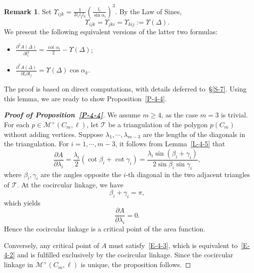 \documentclass[11pt,letterpaper]{amsart}
\theoremstyle{plain}
\theoremstyle{definition}
\newtheorem{remark}[theorem]{Remark}
\theoremstyle{remark}
\numberwithin{equation}{section}
\begin{document}
\begin{remark}\label{R-4-6}
Set $\displaystyle{\Upsilon_{ijk}=\frac{1}{2l_il_jl_k}
\left(\frac{l_i}{\sin\alpha_i}\right)^3}$.
By the Law of Sines,
\[
\Upsilon_{ijk}=\Upsilon_{jki}=\Upsilon_{kij}:=\Upsilon(\Delta).
\]
We present the following equivalent versions of the latter two formulas:
\begin{itemize}
\item[$(ii')$] $\displaystyle{\frac{\partial^2 A(\Delta)}{\partial l_i^2}=\frac{\cot\alpha_i}{2}-\Upsilon(\Delta)}$;
\item[$(iii')$] $\displaystyle{\frac{\partial^2 A(\Delta)}{\partial l_i \partial l_j}=\Upsilon(\Delta)\cos\alpha_k}$.
\end{itemize}
\end{remark}


The proof is based on direct computations, with details deferred to~\S\ref{S-7}. Using this lemma, we are ready to show Proposition~\ref{P-4-4}.


\begin{proof}[\textbf{Proof of Proposition~\ref{P-4-4}}]
We assume $m\geq 4$, as the case $m=3$ is trivial. For each $p\in \mathcal M^{+}(C_m,\ell)$, let $\mathcal T$ be a triangulation of the polygon $p(C_m)$ without adding vertices. Suppose $\lambda_1,\cdots,\lambda_{m-3}$ are the lengths of the diagonals in the triangulation.  For $i=1,\cdots,m-3$, it follows from Lemma~\ref{L-4-5} that
\begin{equation}\label{E-4-1}
\frac{\partial A}{\partial \lambda_i}=\frac{\lambda_i}{2}\left(\cot\beta_i+\cot\gamma_i\right)
=\frac{\lambda_i\sin(\beta_i+\gamma_i)}{2\sin \beta_i\sin\gamma_i},
\end{equation}
where $\beta_i, \gamma_i$ are the angles opposite the  $i$-th diagonal in the two adjacent triangles of $\mathcal T$. At the cocircular linkage, we have
\begin{equation}\label{E-4-2}
\beta_i+\gamma_i=\pi,
\end{equation}
which yields
\begin{equation}\label{E-4-3}
\frac{\partial A}{\partial \lambda_i}=0.
\end{equation}
Hence the cocircular linkage is a critical point of the area function.

Conversely, any critical point of $A$ must satisfy~\eqref{E-4-3}, which is equivalent to~\eqref{E-4-2} and  is fulfilled exclusively by the cocircular linkage. Since the cocircular linkage in $\mathcal M^{+}(C_m,\ell)$ is unique, the proposition follows.
\end{proof}
\end{document}
